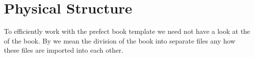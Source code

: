 \documentclass[latexsweetspot.tex]{subfiles}
\begin{document}
\chapter{Physical Structure}
To efficiently work with the prefect book template we need not have a look at
the  of the book.
By  we mean the division of the book into separate files any how these
files are imported into each other.
\end{document}
